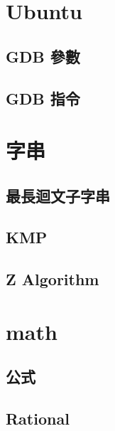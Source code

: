 
\section{Ubuntu}
%         
%         
    \subsection{GDB 參數}
        
    \subsection{GDB 指令}
        
\clearpage

\section{字串}
    \subsection{最長迴文子字串}
         \columnbreak
    \subsection{KMP}
        
    \subsection{Z Algorithm}
        
\clearpage

\section{math}
    \subsection{公式}
        
    \subsection{Rational}
         \columnbreak
